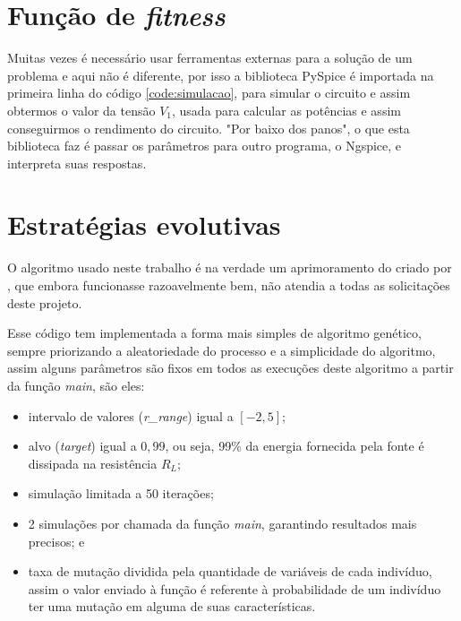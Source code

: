 \documentclass[12pt]{article}
\begin{document}
\section{Função de \textit{fitness}}



Muitas vezes é necessário usar ferramentas externas para a solução de um problema e aqui não é diferente, por isso a biblioteca PySpice é importada na primeira linha do código \ref{code:simulacao}, para simular o circuito e assim obtermos o valor da tensão $V_1$, usada para calcular as potências e assim conseguirmos o rendimento do circuito. "Por baixo dos panos", o que esta biblioteca faz é passar os parâmetros para outro programa, o Ngspice, e interpreta suas respostas.

\section{Estratégias evolutivas}



O algoritmo usado neste trabalho é na verdade um aprimoramento do criado por , que embora funcionasse razoavelmente bem, não atendia a todas as solicitações deste projeto.

Esse código tem implementada a forma mais simples de algoritmo genético, sempre priorizando a aleatoriedade do processo e a simplicidade do algoritmo, assim alguns parâmetros são fixos em todos as execuções deste algoritmo a partir da função \textit{main}, são eles:

\begin{itemize}
    \item intervalo de valores (\textit{r\_range}) igual a $\left[-2,5\right]$;
    \item alvo (\textit{target}) igual a $0,99$, ou seja, 99\% da energia fornecida pela fonte é dissipada na resistência $R_L$;
    \item simulação limitada a 50 iterações;
    \item 2 simulações por chamada da função \textit{main}, garantindo resultados mais precisos; e
    \item taxa de mutação dividida pela quantidade de variáveis de cada indivíduo, assim o valor enviado à função é referente à probabilidade de um indivíduo ter uma mutação em alguma de suas características.
\end{itemize}
\end{document}
